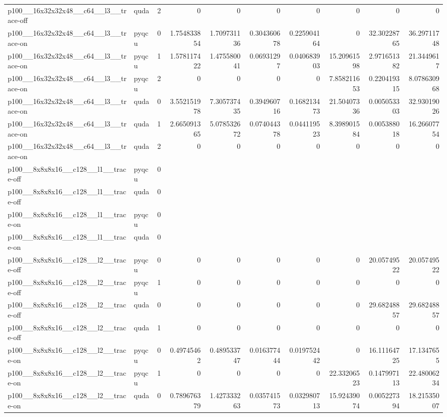 \begin{table}[htbp]
\begin{tabular}{@{}llrrrrrrrr@{}}
p100\_\_16x32x32x48\_\_c64\_\_l3\_\_trace-off & quda & 2 & 0 & 0 & 0 & 0 & 0 & 0 & 0 \\
p100\_\_16x32x32x48\_\_c64\_\_l3\_\_trace-on & pyqcu & 0 & 1.754833854 & 1.709731136 & 0.304360678 & 0.225904164 & 0 & 32.30228765 & 36.29711748 \\
p100\_\_16x32x32x48\_\_c64\_\_l3\_\_trace-on & pyqcu & 1 & 1.578117422 & 1.475580041 & 0.06931297 & 0.040683903 & 15.20961598 & 2.971651382 & 21.3449617 \\
p100\_\_16x32x32x48\_\_c64\_\_l3\_\_trace-on & pyqcu & 2 & 0 & 0 & 0 & 0 & 7.858211653 & 0.220419315 & 8.078630968 \\
p100\_\_16x32x32x48\_\_c64\_\_l3\_\_trace-on & quda & 0 & 3.552151978 & 7.305737435 & 0.394960716 & 0.168213473 & 21.50407336 & 0.005053303 & 32.93019026 \\
p100\_\_16x32x32x48\_\_c64\_\_l3\_\_trace-on & quda & 1 & 2.665091365 & 5.078532672 & 0.074044378 & 0.044119523 & 8.398901584 & 0.005388018 & 16.26607754 \\
p100\_\_16x32x32x48\_\_c64\_\_l3\_\_trace-on & quda & 2 & 0 & 0 & 0 & 0 & 0 & 0 & 0 \\
p100\_\_8x8x8x16\_\_c128\_\_l1\_\_trace-off & pyqcu & 0 &  &  &  &  &  &  &  \\
p100\_\_8x8x8x16\_\_c128\_\_l1\_\_trace-off & quda & 0 &  &  &  &  &  &  &  \\
p100\_\_8x8x8x16\_\_c128\_\_l1\_\_trace-on & pyqcu & 0 &  &  &  &  &  &  &  \\
p100\_\_8x8x8x16\_\_c128\_\_l1\_\_trace-on & quda & 0 &  &  &  &  &  &  &  \\
p100\_\_8x8x8x16\_\_c128\_\_l2\_\_trace-off & pyqcu & 0 & 0 & 0 & 0 & 0 & 0 & 20.05749522 & 20.05749522 \\
p100\_\_8x8x8x16\_\_c128\_\_l2\_\_trace-off & pyqcu & 1 & 0 & 0 & 0 & 0 & 0 & 0 & 0 \\
p100\_\_8x8x8x16\_\_c128\_\_l2\_\_trace-off & quda & 0 & 0 & 0 & 0 & 0 & 0 & 29.68248857 & 29.68248857 \\
p100\_\_8x8x8x16\_\_c128\_\_l2\_\_trace-off & quda & 1 & 0 & 0 & 0 & 0 & 0 & 0 & 0 \\
p100\_\_8x8x8x16\_\_c128\_\_l2\_\_trace-on & pyqcu & 0 & 0.49745462 & 0.489533747 & 0.016377444 & 0.019752442 & 0 & 16.11164725 & 17.1347655 \\
p100\_\_8x8x8x16\_\_c128\_\_l2\_\_trace-on & pyqcu & 1 & 0 & 0 & 0 & 0 & 22.33206523 & 0.147997113 & 22.48006234 \\
p100\_\_8x8x8x16\_\_c128\_\_l2\_\_trace-on & quda & 0 & 0.789676379 & 1.427333263 & 0.035741573 & 0.032980713 & 15.92439074 & 0.005227394 & 18.21535007 \\

\end{tabular}
\end{table}
